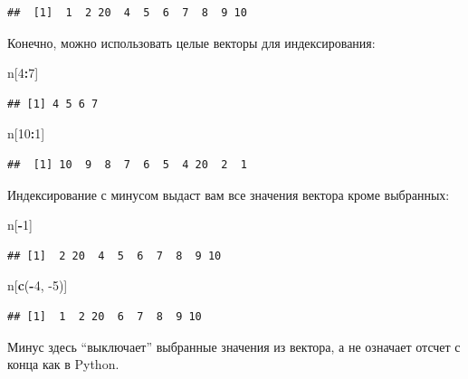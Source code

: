 \documentclass[
]{book}
\newenvironment{Shaded}{\begin{snugshade}}{\end{snugshade}}
\newcommand{\DecValTok}[1]{\textcolor[rgb]{0.00,0.00,0.81}{#1}}
\newcommand{\KeywordTok}[1]{\textcolor[rgb]{0.13,0.29,0.53}{\textbf{#1}}}
\newcommand{\NormalTok}[1]{#1}
\newcommand{\OperatorTok}[1]{\textcolor[rgb]{0.81,0.36,0.00}{\textbf{#1}}}
\begin{document}
\begin{verbatim}
##  [1]  1  2 20  4  5  6  7  8  9 10
\end{verbatim}

Конечно, можно использовать целые векторы для индексирования:

\begin{Shaded}
\begin{Highlighting}[]
\NormalTok{n[}\DecValTok{4}\OperatorTok{:}\DecValTok{7}\NormalTok{]}
\end{Highlighting}
\end{Shaded}

\begin{verbatim}
## [1] 4 5 6 7
\end{verbatim}

\begin{Shaded}
\begin{Highlighting}[]
\NormalTok{n[}\DecValTok{10}\OperatorTok{:}\DecValTok{1}\NormalTok{]}
\end{Highlighting}
\end{Shaded}

\begin{verbatim}
##  [1] 10  9  8  7  6  5  4 20  2  1
\end{verbatim}

Индексирование с минусом выдаст вам все значения вектора кроме выбранных:

\begin{Shaded}
\begin{Highlighting}[]
\NormalTok{n[}\OperatorTok{-}\DecValTok{1}\NormalTok{]}
\end{Highlighting}
\end{Shaded}

\begin{verbatim}
## [1]  2 20  4  5  6  7  8  9 10
\end{verbatim}

\begin{Shaded}
\begin{Highlighting}[]
\NormalTok{n[}\KeywordTok{c}\NormalTok{(}\OperatorTok{-}\DecValTok{4}\NormalTok{, }\DecValTok{-5}\NormalTok{)]}
\end{Highlighting}
\end{Shaded}

\begin{verbatim}
## [1]  1  2 20  6  7  8  9 10
\end{verbatim}

Минус здесь ``выключает'' выбранные значения из вектора, а не означает отсчет с конца как в Python.
\end{document}
